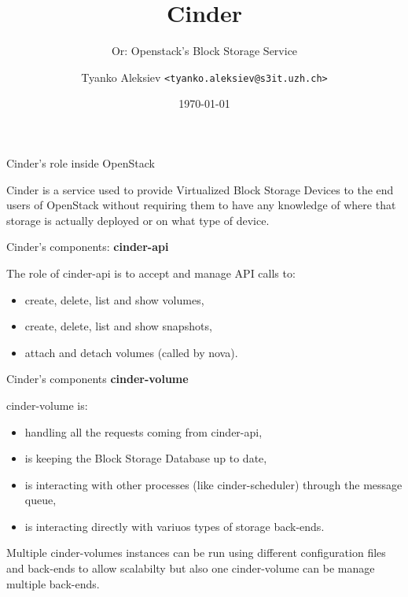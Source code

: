 \documentclass[english,serif,mathserif]{beamer}
\begin{document}
\title[Short Title]{Cinder}
\subtitle{Or: Openstack's Block Storage Service}

\author{Tyanko Aleksiev \texttt{<tyanko.aleksiev@s3it.uzh.ch>}}

\date{\today}

\maketitle

\begin{frame}{Cinder's role inside OpenStack}

Cinder is a service used to provide Virtualized Block Storage Devices to the 
end users of OpenStack without requiring them to have any knowledge of where 
that storage is actually deployed or on what type of device. 

\end{frame}

\begin{frame}{Cinder's components: \textbf{cinder-api}}

The role of cinder-api is to accept and manage API calls to:

\begin{itemize}
\item create, delete, list and show volumes,
\item create, delete, list and show snapshots,
\item attach and detach volumes (called by nova).
\end{itemize}

\end{frame}

\begin{frame}{Cinder's components \textbf{cinder-volume}}

cinder-volume is:
\begin{itemize}
\item handling all the requests coming from cinder-api, 
\item is keeping the Block Storage Database up to date,
\item is interacting with other processes (like cinder-scheduler) through the message queue,
\item is interacting directly with variuos types of storage back-ends.
\end{itemize}

Multiple cinder-volumes instances can be run using different configuration files and
back-ends to allow scalabilty but also one cinder-volume can be manage multiple back-ends.

\end{frame}
\end{document}
